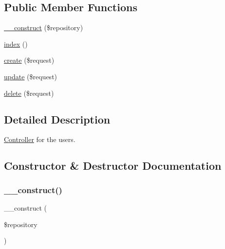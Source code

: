 \subsection*{Public Member Functions}
\begin{DoxyCompactItemize}
\item 
\mbox{\hyperlink{class_app_1_1_http_1_1_controllers_1_1_user_controller_a5b75ba6bc9debb999c0186a31978ec03}{\+\_\+\+\_\+construct}} (\$repository)
\item 
\mbox{\hyperlink{class_app_1_1_http_1_1_controllers_1_1_user_controller_a149eb92716c1084a935e04a8d95f7347}{index}} ()
\item 
\mbox{\hyperlink{class_app_1_1_http_1_1_controllers_1_1_user_controller_a4fa811c83f27da01b0d92bdb2a711a13}{create}} (\$request)
\item 
\mbox{\hyperlink{class_app_1_1_http_1_1_controllers_1_1_user_controller_ab7b27a90191560dcef32126b0945db0d}{update}} (\$request)
\item 
\mbox{\hyperlink{class_app_1_1_http_1_1_controllers_1_1_user_controller_a126a3799c44d72393ca4732081306dfd}{delete}} (\$request)
\end{DoxyCompactItemize}


\subsection{Detailed Description}
\mbox{\hyperlink{class_app_1_1_http_1_1_controllers_1_1_controller}{Controller}} for the users. 

\subsection{Constructor \& Destructor Documentation}
\mbox{\label{class_app_1_1_http_1_1_controllers_1_1_user_controller_a5b75ba6bc9debb999c0186a31978ec03}} 
\subsubsection{\texorpdfstring{\+\_\+\+\_\+construct()}{\_\_construct()}}
{\footnotesize\ttfamily \+\_\+\+\_\+construct (\begin{DoxyParamCaption}\item[{}]{\$repository }\end{DoxyParamCaption})}

